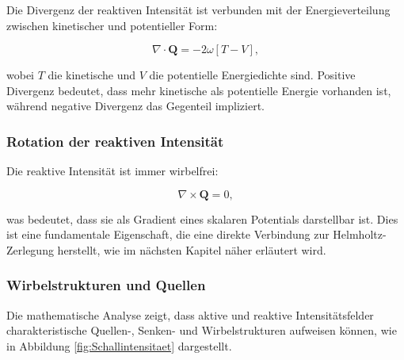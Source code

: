 Die Divergenz der reaktiven Intensität ist verbunden mit der Energieverteilung zwischen kinetischer und potentieller Form:

\begin{equation}
\nabla \cdot \mathbf{Q} = -2 \omega [T-V],
\end{equation}

\noindent wobei $T$ die kinetische und $V$ die potentielle Energiedichte sind. Positive Divergenz bedeutet, dass mehr kinetische als potentielle Energie vorhanden ist, während negative Divergenz das Gegenteil impliziert.

\subsubsection{Rotation der reaktiven Intensität}

Die reaktive Intensität ist immer wirbelfrei:

\begin{equation}
\nabla \times \mathbf{Q} = 0,
\end{equation}

\noindent was bedeutet, dass sie als Gradient eines skalaren Potentials darstellbar ist. Dies ist eine fundamentale Eigenschaft, die eine direkte Verbindung zur Helmholtz-Zerlegung herstellt, wie im nächsten Kapitel näher erläutert wird.

\subsubsection{Wirbelstrukturen und Quellen}

Die mathematische Analyse zeigt, dass aktive und reaktive Intensitätsfelder charakteristische Quellen-, Senken- und Wirbelstrukturen aufweisen können, wie in Abbildung \ref{fig:Schallintensitaet} dargestellt.

